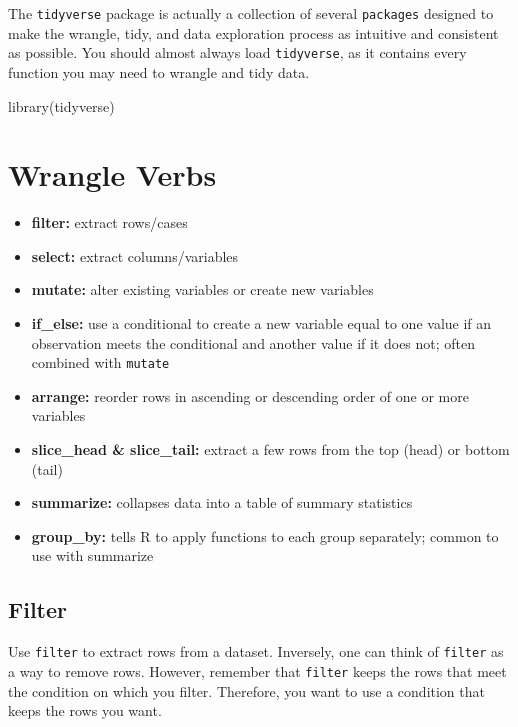 \documentclass[
]{book}
\makeatletter
\newenvironment{Shaded}{\begin{snugshade}}{\end{snugshade}}
\newcommand{\FunctionTok}[1]{\textcolor[rgb]{0,0,0}{#1}}
\newcommand{\NormalTok}[1]{#1}
\providecommand{\tightlist}{%
  \setlength{\itemsep}{0pt}\setlength{\parskip}{0pt}}
\newenvironment{kframe}{%
\medskip{}
\setlength{\fboxsep}{.8em}
 \def\at@end@of@kframe{}%
 \ifinner\ifhmode%
  \def\at@end@of@kframe{\end{minipage}}%
  \begin{minipage}{\columnwidth}%
 \fi\fi%
 \def\FrameCommand##1{\hskip\@totalleftmargin \hskip-\fboxsep
 \colorbox{shadecolor}{##1}\hskip-\fboxsep
     \hskip-\linewidth \hskip-\@totalleftmargin \hskip\columnwidth}%
 \MakeFramed {\advance\hsize-\width
   \@totalleftmargin\z@ \linewidth\hsize
   \@setminipage}}%
 {\par\unskip\endMakeFramed%
 \at@end@of@kframe}
\renewenvironment{Shaded}{\begin{kframe}}{\end{kframe}}
\makeatother
\begin{document}
The \texttt{tidyverse} package is actually a collection of several \texttt{packages} designed to make the wrangle, tidy, and data exploration process as intuitive and consistent as possible. You should almost always load \texttt{tidyverse}, as it contains every function you may need to wrangle and tidy data.

\begin{Shaded}
\begin{Highlighting}[]
\FunctionTok{library}\NormalTok{(tidyverse)}
\end{Highlighting}
\end{Shaded}

\hypertarget{wrangle-verbs}{%
\section{Wrangle Verbs}\label{wrangle-verbs}}

\begin{itemize}
\tightlist
\item
  \textbf{filter:} extract rows/cases
\item
  \textbf{select:} extract columns/variables
\item
  \textbf{mutate:} alter existing variables or create new variables
\item
  \textbf{if\_else:} use a conditional to create a new variable equal to one value if an observation meets the conditional and another value if it does not; often combined with \texttt{mutate}
\item
  \textbf{arrange:} reorder rows in ascending or descending order of one or more variables
\item
  \textbf{slice\_head \& slice\_tail:} extract a few rows from the top (head) or bottom (tail)
\item
  \textbf{summarize:} collapses data into a table of summary statistics
\item
  \textbf{group\_by:} tells R to apply functions to each group separately; common to use with summarize
\end{itemize}

\hypertarget{filter}{%
\subsection{Filter}\label{filter}}

Use \texttt{filter} to extract rows from a dataset. Inversely, one can think of \texttt{filter} as a way to remove rows. However, remember that \texttt{filter} keeps the rows that meet the condition on which you filter. Therefore, you want to use a condition that keeps the rows you want.
\end{document}
